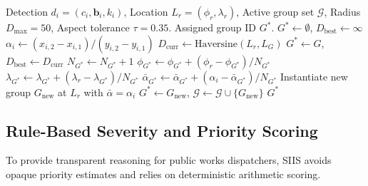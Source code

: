 \begin{algorithm}[!t]
\caption{Spatial Deduplication and Issue Group Centroid Update}
\label{alg:grouping}
\begin{algorithmic}[1]
\REQUIRE Detection $d_i = (c_i, \mathbf{b}_i, k_i)$, Location $L_r = (\phi_r, \lambda_r)$, Active group set $\mathcal{G}$, Radius $D_{\text{max}} = 50$, Aspect tolerance $\tau = 0.35$.
\ENSURE Assigned group ID $G^*$.
\STATE $G^* \leftarrow \emptyset$, $D_{\text{best}} \leftarrow \infty$
\STATE $\alpha_i \leftarrow (x_{i,2} - x_{i,1}) / (y_{i,2} - y_{i,1})$
        \STATE $D_{\text{curr}} \leftarrow \text{Haversine}(L_r, L_G)$
                \STATE $G^* \leftarrow G$, $D_{\text{best}} \leftarrow D_{\text{curr}}$
            \ENDIF
        \ENDIF
    \ENDIF
\ENDFOR
{}
    \STATE $N_{G^*} \leftarrow N_{G^*} + 1$
    \STATE $\phi_{G^*} \leftarrow \phi_{G^*} + (\phi_r - \phi_{G^*}) / N_{G^*}$
    \STATE $\lambda_{G^*} \leftarrow \lambda_{G^*} + (\lambda_r - \lambda_{G^*}) / N_{G^*}$
    \STATE $\bar{\alpha}_{G^*} \leftarrow \bar{\alpha}_{G^*} + (\alpha_i - \bar{\alpha}_{G^*}) / N_{G^*}$
\ELSE
    \STATE Instantiate new group $G_{\text{new}}$ at $L_r$ with $\bar{\alpha} = \alpha_i$
    \STATE $G^* \leftarrow G_{\text{new}}$, $\mathcal{G} \leftarrow \mathcal{G} \cup \{G_{\text{new}}\}$
\ENDIF
\RETURN $G^*$
\end{algorithmic}
\end{algorithm}

\subsection{Rule-Based Severity and Priority Scoring}
To provide transparent reasoning for public works dispatchers, SIIS avoids opaque priority estimates and relies on deterministic arithmetic scoring.

